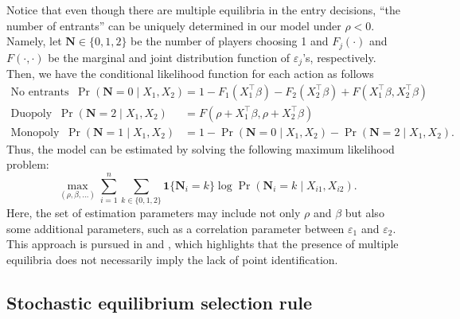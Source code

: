 \documentclass[10.5pt, A4paper, openany, uplatex]{book}
\newcommand{\mbf}{\mathbf}
\newcommand{\eps}{\varepsilon}
\numberwithin{equation}{section}
\begin{document}
Notice that even though there are multiple equilibria in the entry decisions, ``the number of entrants'' can be uniquely determined in our model under $\rho < 0$.
Namely, let $\mbf{N} \in \{0,1,2\}$ be the number of players choosing 1 and $F_j(\cdot)$ and $F(\cdot, \cdot)$ be the marginal and joint distribution function of $\eps_j$'s, respectively.
Then, we have the conditional likelihood function for each action as follows
\begin{align*}
	\text{No entrants} \;\; \Pr(\mbf{N} = 0 \mid X_1, X_2) 
	& = 1 - F_1(X_1^\top\beta) - F_2(X_2^\top\beta) + F(X_1^\top\beta, X_2^\top\beta) \\
	\text{Duopoly} \;\; \Pr(\mbf{N} = 2 \mid X_1, X_2) 
	& = F(\rho + X_1^\top\beta, \rho + X_2^\top\beta) \\
	\text{Monopoly} \;\; \Pr(\mbf{N} = 1 \mid X_1, X_2)
	& = 1 - \Pr(\mbf{N} = 0 \mid X_1, X_2) - \Pr(\mbf{N} = 2 \mid X_1, X_2).  
\end{align*}
Thus, the model can be estimated by solving the following maximum likelihood problem:
\[
	\max_{(\rho, \beta, \ldots)} \sum_{i = 1}^n \sum_{k \in \{0,1,2\}} \mbf{1}\{\mbf{N}_i = k\} \log \Pr(\mbf{N}_i = k \mid X_{i1}, X_{i2}).
\]
Here, the set of estimation parameters may include not only $\rho$ and $\beta$ but also some additional parameters, such as a correlation parameter between $\eps_1$ and $\eps_2$. 
This approach is pursued in \cite{bresnahan1990entry} and \cite{berry1992estimation}, which highlights that the presence of multiple equilibria does not necessarily imply the lack of point identification.

\subsection{Stochastic equilibrium selection rule}\label{subsec:stochastic}
\end{document}
